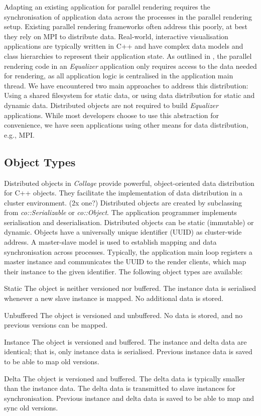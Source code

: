 Adapting an existing application for parallel rendering requires the
synchronisation of application data across the processes in the parallel
rendering setup. Existing parallel rendering frameworks often address this
poorly, at best they rely on MPI to distribute data. Real-world, interactive
visualisation applications are typically written in C++ and have complex data
models and class hierarchies to represent their application state. As outlined
in \cite{EMP:09}, the parallel rendering code in an {\em Equalizer}
application only requires access to the data needed for rendering, as all
application logic is centralised in the application main thread. We have
encountered two main approaches to address this distribution: Using a shared
filesystem for static data, or using data distribution for static and dynamic
data. Distributed objects are not required to build {\em Equalizer}
applications. While most developers choose to use this abstraction for
convenience, we have seen applications using other means for data distribution,
e.g., MPI.

\subsection{Object Types}

Distributed objects in {\em Collage} provide powerful, object-oriented data
distribution for C++ objects. They facilitate the implementation of data
distribution in a cluster environment. (2x one?) Distributed objects are created by
subclassing from {\em co::Serializable} or {\em co::Object}. The
application programmer implements serialisation and deserialisation. Distributed
objects can be static (immutable) or dynamic. Objects have a universally unique
identifier (UUID) as cluster-wide address. A master-slave model is used to
establish mapping and data synchronisation across processes. Typically, the
application main loop registers a master instance and communicates the UUID to
the render clients, which map their instance to the given identifier. The
following object types are available:

\begin{compactdesc}
\item[Static] The object is neither versioned nor buffered. The instance data is
  serialised whenever a new slave instance is mapped. No additional data is
  stored.
\item[Unbuffered] The object is versioned and unbuffered. No data is stored, and
  no previous versions can be mapped.
\item[Instance] The object is versioned and buffered. The instance and delta
  data are identical; that is, only instance data is serialised. Previous
  instance data is saved to be able to map old versions.
\item[Delta] The object is versioned and buffered. The delta data is typically
  smaller than the instance data. The delta data is transmitted to slave
  instances for synchronisation. Previous instance and delta data is saved to be
  able to map and sync old versions.
\end{compactdesc}

